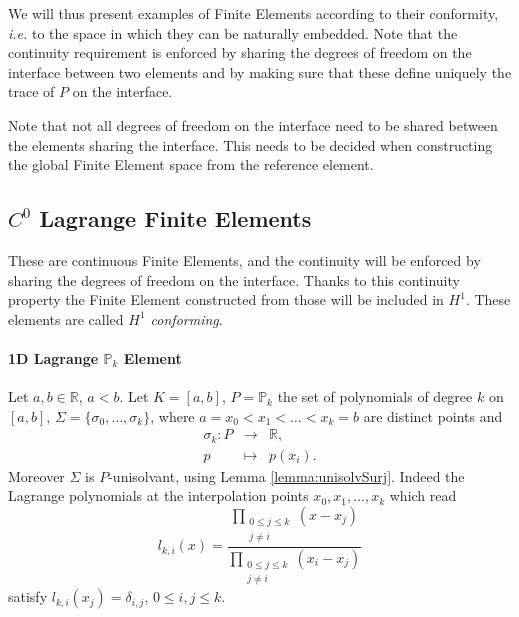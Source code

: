 We will thus present examples of Finite Elements according to their conformity, \textit{i.e.} to the space in which they can be naturally embedded. Note that the continuity requirement is enforced by sharing the degrees of freedom on the interface between two elements and by making sure that these define uniquely the trace of $P$ on the interface.

\begin{remark}
Note that not all degrees of freedom on the interface need to be shared between the elements sharing the interface. This needs to be decided when constructing the global Finite Element space from the reference element.
\end{remark}

\subsection{$C^0$ Lagrange Finite Elements}

These are continuous Finite Elements, and the continuity will be enforced by sharing the degrees of freedom on the interface.   Thanks to this continuity property the Finite Element constructed from those will be included in $H^1$. These elements are called \emph{$H^1$ conforming}.

\paragraph{1D Lagrange $\mathbb{P}_k$ Element } Let $a,b\in \mathbb{R}$, $a<b$. Let $K=[a,b]$, 
$P= \mathbb{P}_k$ the set of polynomials of degree $k$ on $[a,b]$, $\Sigma=\{\sigma_0, \dots,
\sigma_k\}$, where $a= x_0 < x_1 < \dots < x_k= b$ are distinct points and
$$
\begin{array}{rcl}
\sigma_k:P&\rightarrow & \mathbb{R},\\
p&\mapsto &p(x_i).
\end{array}$$
Moreover $\Sigma$ is $P$-unisolvant, using Lemma \ref{lemma:unisolvSurj}. Indeed the Lagrange polynomials
at the interpolation points $x_0,x_1, \dots, x_k$ which read
\begin{equation}\label{eq:LagrangePol}
l_{k,i}(x)=\frac{\displaystyle \prod_{\substack{0\leq j\leq k \\ j\neq i}} (x -x_j)}{
\displaystyle \prod_{\substack{0\leq j\leq k \\ j\neq i}} (x_i -x_j)}
\end{equation}
satisfy 
 $l_{k,i}(x_j)=\delta_{i,j}$, $0\leq i,j \leq k$.
 
